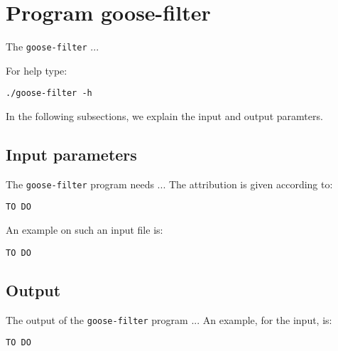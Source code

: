 \section{Program goose-filter}
The \texttt{goose-filter} ...

For help type:
\begin{lstlisting}
./goose-filter -h
\end{lstlisting}
In the following subsections, we explain the input and output paramters.

\subsection{Input parameters}

The \texttt{goose-filter} program needs ...
The attribution is given according to:
\begin{lstlisting}
TO DO
\end{lstlisting}

An example on such an input file is:
\begin{lstlisting}
TO DO
\end{lstlisting}

\subsection{Output}
The output of the \texttt{goose-filter} program ...
An example, for the input, is:
\begin{lstlisting}
TO DO
\end{lstlisting}
